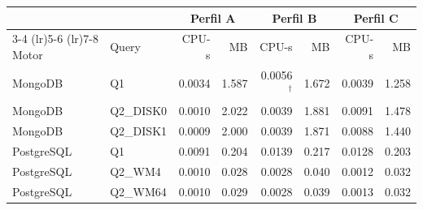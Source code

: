 \begin{tabular}{llrrrrrr}
\toprule
 & & \multicolumn{2}{c}{Perfil A} & \multicolumn{2}{c}{Perfil B} & \multicolumn{2}{c}{Perfil C} \\
\cmidrule(lr){3-4} \cmidrule(lr){5-6} \cmidrule(lr){7-8}
Motor & Query & CPU-s & MB & CPU-s & MB & CPU-s & MB \\
\midrule
MongoDB & Q1 & 0.0034 & 1.587 & 0.0056$^\dagger$ & 1.672 & 0.0039 & 1.258 \\
MongoDB & Q2\_DISK0 & 0.0010 & 2.022 & 0.0039 & 1.881 & 0.0091 & 1.478 \\
MongoDB & Q2\_DISK1 & 0.0009 & 2.000 & 0.0039 & 1.871 & 0.0088 & 1.440 \\
\midrule
PostgreSQL & Q1 & 0.0091 & 0.204 & 0.0139 & 0.217 & 0.0128 & 0.203 \\
PostgreSQL & Q2\_WM4 & 0.0010 & 0.028 & 0.0028 & 0.040 & 0.0012 & 0.032 \\
PostgreSQL & Q2\_WM64 & 0.0010 & 0.029 & 0.0028 & 0.039 & 0.0013 & 0.032 \\
\bottomrule
\end{tabular}
